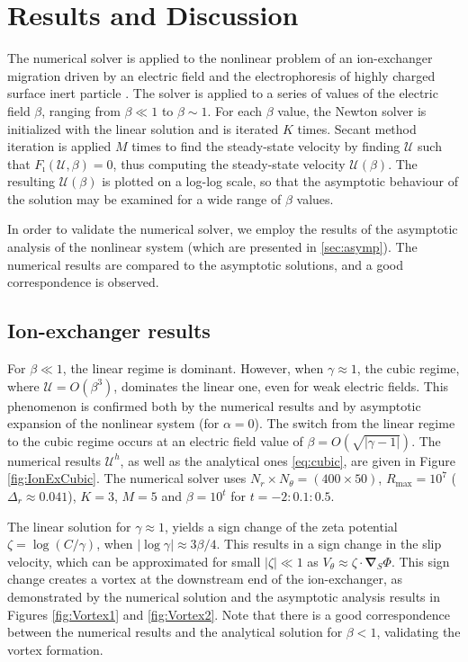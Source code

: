\documentclass[preprint,10pt]{elsarticle}
\newcommand\bnabla{\boldsymbol{\nabla}}
\newcommand\cU{\mathscr{U}}
\begin{document}
\section{Results and Discussion} \label{ch:results}

The numerical solver is applied to the nonlinear problem of an ion-exchanger migration 
driven by an electric field \cite{yariv2010migration}
and the electrophoresis of highly charged surface inert particle 
\cite{schnitzer2012surface}. 
The solver is applied to a series of values of the electric field $\beta$, ranging 
from $\beta \ll 1$ to $\beta \sim 1$.
For each $\beta$ value, the Newton solver is initialized with the linear solution and is iterated $K$ times.
Secant method iteration is applied $M$ times to find the steady-state velocity 
by finding $\cU$ such that $F_\imath(\cU, \beta) = 0$, thus computing 
the steady-state velocity $\cU(\beta)$. 
The resulting $\cU(\beta)$ is plotted on a log-log scale, so that the asymptotic behaviour
of the solution may be examined for a wide range of $\beta$ values.
 
In order to validate the numerical solver, we employ 
the results of the asymptotic analysis of the nonlinear 
system (which are presented in \ref{sec:asymp}). 
The numerical results are compared 
to the asymptotic solutions, and a good correspondence is observed.

\subsection{Ion-exchanger results}
For $\beta \ll 1$, the linear regime \cite{yariv2010asymptotic} is dominant.
However, when $\gamma \approx 1$, the cubic regime, where $\cU = O(\beta^3)$, 
dominates the linear one, even for weak electric fields. 
This phenomenon is confirmed both by the numerical
results and by asymptotic expansion of the nonlinear system (for $\alpha=0$).
The switch from the linear regime to the cubic regime occurs at 
an electric field value of $\beta = O(\sqrt{|\gamma - 1|})$.
The numerical results $\cU^h$, 
as well as the analytical ones \eqref{eq:cubic}, are given in Figure \ref{fig:IonExCubic}.
The numerical solver uses $N_r \times N_\theta = (400 \times 50)$, 
$R_{\max} = 10^7$ ($\Delta_r \approx 0.041$),
$K = 3$, $M = 5$ and $\beta = 10^{t}$ for $t = -2:0.1:0.5$.

The linear solution for $\gamma \approx 1$, 
yields a sign change of the zeta potential $\zeta = \log (C/\gamma)$, when
$|\log\gamma| \approx 3\beta / 4$. This results in a sign change in the slip velocity,
which can be approximated for small $|\zeta| \ll 1$ as $V_\theta \approx \zeta \cdot \bnabla_S \varPhi$.
This sign change creates a vortex at the downstream end of the ion-exchanger, 
as demonstrated by the numerical solution and the asymptotic analysis results 
in Figures \ref{fig:Vortex1} and \ref{fig:Vortex2}.
Note that there is a good correspondence between the numerical
results and the analytical solution for $\beta < 1$, validating
the vortex formation.
\end{document}
